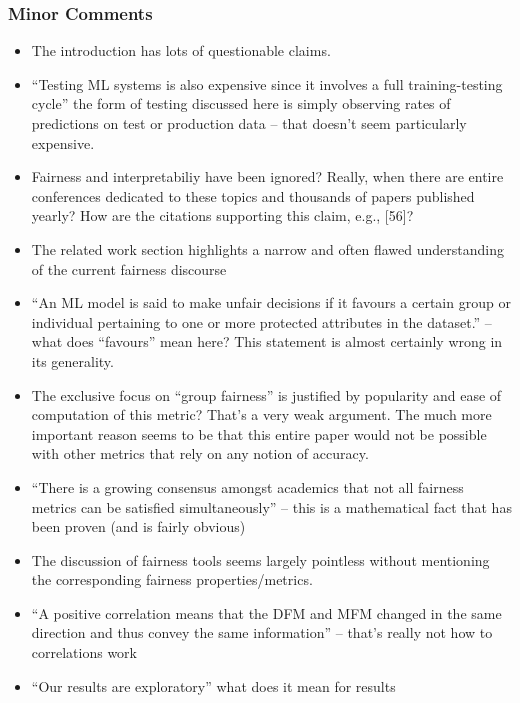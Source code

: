 \documentclass[conference]{IEEEtran}
\begin{document}
\subsubsection{Minor Comments}
\begin{itemize}
  \item The introduction has lots of questionable claims.
  \item ``Testing ML systems is also expensive since it involves
    a full training-testing cycle'' the form of testing discussed here
    is simply observing rates of predictions on test or production
    data -- that doesn’t seem particularly expensive.
  \item Fairness and interpretabiliy have been ignored? Really, when
    there are entire conferences dedicated to these topics and
    thousands of papers published yearly? How are the citations
    supporting this claim, e.g., [56]?
  \item The related work section highlights a narrow and often flawed
    understanding of the current fairness discourse
  \item ``An ML model is said to make unfair decisions if it favours
    a certain group or individual pertaining to one or more protected
    attributes in the dataset.'' -- what does ``favours'' mean here?
    This statement is almost certainly wrong in its generality.
  \item The exclusive focus on ``group fairness'' is justified by
    popularity and ease of computation of this metric? That’s a very
    weak argument. The much more important reason seems to be that
    this entire paper would not be possible with other metrics that
    rely on any notion of accuracy.
  \item ``There is a growing consensus amongst academics that not all
    fairness metrics can be satisfied simultaneously'' -- this is
    a mathematical fact that has been proven (and is fairly obvious)
  \item The discussion of fairness tools seems largely pointless
    without mentioning the corresponding fairness properties/metrics.
  \item ``A positive correlation means that the DFM and MFM changed in
    the same direction and thus convey the same information'' --
    that’s really not how to correlations work
  \item ``Our results are exploratory'' what does it mean for results

\end{itemize}
\end{document}
